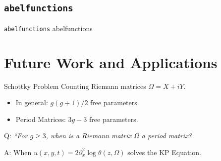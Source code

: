 \documentclass {beamer}
\begin{document}
\subsection{{\tt abelfunctions}}

\begin{frame}{{\tt abelfunctions}}
  abelfunctions
\end{frame}


\section{Future Work and Applications}

\begin{frame}{Schottky Problem}{}
  Counting Riemann matrices $\Omega = X + iY$.
  \begin{itemize}
    \item In general: $g(g+1)/2$ free parameters.
    \item Period Matrices: $3g-3$ free parameters.
  \end{itemize}

  Q: {\it ``For $g \geq 3$, when is a Riemann matrix $\Omega$ a period
    matrix?}

  A: When $u(x,y,t) = 2 \partial^2_x \log \theta(z,\Omega)$ solves the
  KP Equation.
\end{frame}


\begin{frame}
\end{frame}
\end{document}
